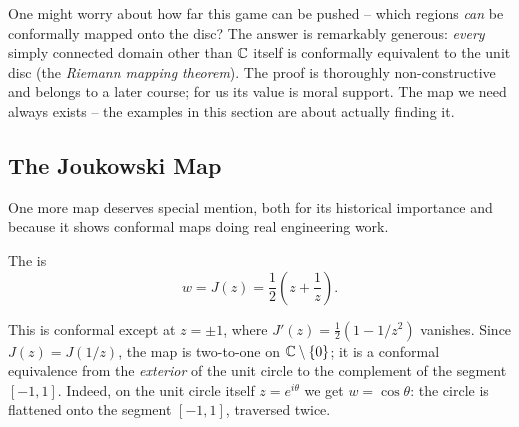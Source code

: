 \documentclass[a4paper]{scrartcl}
\begin{document}
\begin{remark}
	One might worry about how far this game can be pushed -- which regions \emph{can} be conformally mapped onto the disc? The answer is remarkably generous: \emph{every} simply connected domain other than $\mathbb{C}$ itself is conformally equivalent to the unit disc (the \emph{Riemann mapping theorem}). The proof is thoroughly non-constructive and belongs to a later course; for us its value is moral support. The map we need always exists -- the examples in this section are about actually finding it.
\end{remark}

\subsection{The Joukowski Map}

One more map deserves special mention, both for its historical importance and because it shows conformal maps doing real engineering work.

\begin{definition}
	The  is
	$$
	w = J(z) = \frac{1}{2}\left(z + \frac{1}{z}\right).
	$$
\end{definition}

This is conformal except at $z = \pm 1$, where $J'(z) = \frac{1}{2}(1 - 1/z^2)$ vanishes. Since $J(z) = J(1/z)$, the map is two-to-one on $\mathbb{C} \setminus \{0\}$; it is a conformal equivalence from the \emph{exterior} of the unit circle to the complement of the segment $[-1, 1]$. Indeed, on the unit circle itself $z = e^{i\theta}$ we get $w = \cos\theta$: the circle is flattened onto the segment $[-1, 1]$, traversed twice.
\end{document}
